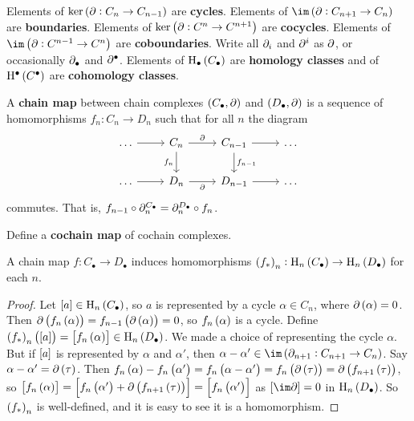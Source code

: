 Elements of $ \ker \br{\da : C_n \to C_{n - 1}} $ are \textbf{cycles}. Elements of $ \im \br{\da : C_{n + 1} \to C_n} $ are \textbf{boundaries}. Elements of $ \ker \br{\da : C^n \to C^{n + 1}} $ are \textbf{cocycles}. Elements of $ \im \br{\da : C^{n - 1} \to C^n} $ are \textbf{coboundaries}. Write all $ \partial_i $ and $ \partial^i $ as $ \partial $, or occasionally $ \partial_\bullet $ and $ \partial^\bullet $. Elements of $ \H_\bullet\br{C_\bullet} $ are \textbf{homology classes} and of $ \H^\bullet\br{C^\bullet} $ are \textbf{cohomology classes}.

\begin{definition*}
A \textbf{chain map} between chain complexes $ \br{C_\bullet, \da} $ and $ \br{D_\bullet, \da} $ is a sequence of homomorphisms $ f_n : C_n \to D_n $ such that for all $ n $ the diagram
$$
\begin{tikzcd}
\dots \arrow{r} & C_n \arrow{r}{\da} \arrow{d}[swap]{f_n} & C_{n - 1} \arrow{r} \arrow{d}{f_{n - 1}} & \dots \\
\dots \arrow{r} & D_n \arrow{r}[swap]{\da} & D_{n - 1} \arrow{r} & \dots
\end{tikzcd}
$$
commutes. That is, $ f_{n - 1} \circ \partial_n^{C_\bullet} = \partial_n^{D_\bullet} \circ f_n $.
\end{definition*}

\begin{exercise*}
Define a \textbf{cochain map} of cochain complexes.
\end{exercise*}

\begin{lemma}
A chain map $ f : C_\bullet \to D_\bullet $ induces homomorphisms $ \br{f_*}_n : \H_n\br{C_\bullet} \to \H_n\br{D_\bullet} $ for each $ n $.
\end{lemma}

\begin{proof}
Let $ \sbr{a} \in \H_n\br{C_\bullet} $, so $ a $ is represented by a cycle $ \alpha \in C_n $, where $ \da\br{\alpha} = 0 $. Then $ \da\br{f_n\br{\alpha}} = f_{n - 1}\br{\da\br{\alpha}} = 0 $, so $ f_n\br{\alpha} $ is a cycle. Define $ \br{f_*}_n\br{\sbr{a}} = \sbr{f_n\br{\alpha}} \in \H_n\br{D_\bullet} $. We made a choice of representing the cycle $ \alpha $. But if $ \sbr{a} $ is represented by $ \alpha $ and $ \alpha' $, then $ \alpha - \alpha' \in \im \br{\da_{n + 1} : C_{n + 1} \to C_n} $. Say $ \alpha - \alpha' = \da\br{\tau} $. Then $ f_n\br{\alpha} - f_n\br{\alpha'} = f_n\br{\alpha - \alpha'} = f_n\br{\da\br{\tau}} = \da\br{f_{n + 1}\br{\tau}} $, so $ \sbr{f_n\br{\alpha}} = \sbr{f_n\br{\alpha'} + \da\br{f_{n + 1}\br{\tau}}} = \sbr{f_n\br{\alpha'}} $ as $ \sbr{\im \da} = 0 $ in $ \H_n\br{D_\bullet} $. So $ \br{f_*}_n $ is well-defined, and it is easy to see it is a homomorphism.
\end{proof}

